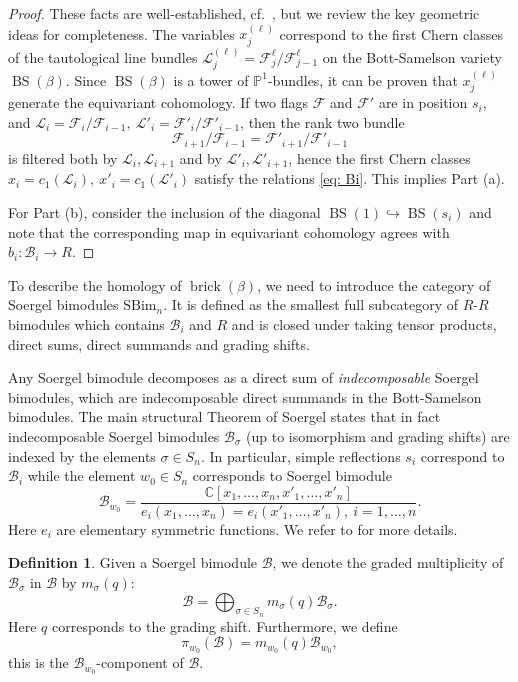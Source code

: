 \documentclass[10pt]{amsart}
\theoremstyle{plain}
\theoremstyle{definition}
\newtheorem{definition}[thm]{Definition}
\theoremstyle{remark}
\numberwithin{equation}{section}
\newcommand{\C}{\mathbb{C}}
\newcommand{\SB}{\mathscr{B}}
\newcommand{\SBim}{\mathrm{SBim}}
\renewcommand{\C}{\mathbb{C}}
\newcommand{\cF}{\mathscr{F}}
\newcommand{\cL}{\mathcal{L}}
\newcommand{\brick}{\operatorname{brick}}
\DeclareMathOperator{\BS}{BS}
\begin{document}
\begin{proof}
These facts are well-established, cf.~\cite{soergelbook}, but we review the key geometric ideas for completeness. The variables $x^{(\ell)}_{j}$ correspond to the first Chern classes of the tautological line bundles $\cL^{(\ell)}_{j}=\cF^{\ell}_{j}/\cF^{\ell}_{j-1}$ on the Bott-Samelson variety $\BS(\beta)$. Since $\BS(\beta)$ is a tower of $\mathbb{P}^1$-bundles, it can be proven that
$x^{(\ell)}_{j}$ generate the equivariant cohomology. If two flags $\cF$ and $\cF'$ are in position $s_i$, and $\cL_i=\cF_i/\cF_{i-1},\ \cL'_i=\cF'_i/\cF'_{i-1}$, then the rank two bundle 
$$
\cF_{i+1}/\cF_{i-1}=\cF'_{i+1}/\cF'_{i-1}
$$
is filtered both by $\cL_i,\cL_{i+1}$ and by $\cL'_i,\cL'_{i+1}$, hence the first Chern classes
$x_i=c_1(\cL_i),\ x'_i=c_1(\cL'_i)$ satisfy the relations \eqref{eq: Bi}. This implies Part (a).

For Part (b), consider the inclusion of the diagonal 
$\BS(1) \hookrightarrow \BS(s_i)$ and note that the corresponding map in equivariant cohomology agrees with $b_i:\SB_i\to R$.
\end{proof}

To describe the homology of $
\brick(\beta)$, we need to introduce the category of Soergel bimodules $\SBim_n$. It is defined as the smallest full subcategory of $R$-$R$ bimodules which contains $\SB_i$ and $R$ and is closed under taking tensor products, direct sums, direct summands and grading shifts. 

Any Soergel bimodule decomposes as a direct sum of {\em indecomposable} Soergel bimodules, which are indecomposable direct summands in the Bott-Samelson bimodules. The main structural Theorem of Soergel \cite{Soergel07} states that in fact indecomposable Soergel bimodules $\SB_{\sigma}$ (up to isomorphism and grading shifts) are indexed by the elements $\sigma\in S_n$. In particular, simple reflections $s_i$ correspond to $\SB_i$ while the element $w_0\in S_n$ corresponds to Soergel bimodule
$$
\SB_{w_0}=\frac{\C[x_1,\ldots,x_n,x'_1,\ldots,x'_n]}{e_i(x_1,\ldots,x_n)=e_i(x'_1,\ldots,x'_n),\ i=1,\ldots,n}.
$$
Here $e_i$ are elementary symmetric functions. 
We refer to \cite{soergelbook} for more details. 

\begin{definition}
Given a Soergel bimodule $\SB$, we denote the graded multiplicity of $\SB_{\sigma}$ in $\SB$ by $m_{\sigma}(q)$:
$$
\SB=\bigoplus_{\sigma\in S_n}m_{\sigma}(q)\SB_{\sigma}.
$$
Here $q$ corresponds to the grading shift. Furthermore, we define 
$$
\pi_{w_0}(\SB)=m_{w_0}(q)\SB_{w_0},
$$
this is the $\SB_{w_0}$-component of $\SB$.
\end{definition}
\end{document}

